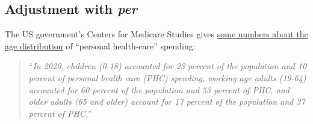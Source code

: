 \documentclass[
  letterpaper,
  DIV=11,
  numbers=noendperiod,
  oneside]{scrartcl}
\begin{document}

\subsection{\texorpdfstring{Adjustment with
\emph{per}}{Adjustment with per}}\label{sec-per-adjustment}

The US government's Centers for Medicare Studies gives
\href{https://www.cms.gov/Research-Statistics-Data-and-Systems/Statistics-Trends-and-Reports/NationalHealthExpendData/Downloads/AgeandGenderHighlights.pdf}{some
numbers about the age distribution} of ``personal health-care''
spending:

\begin{quote}
``\emph{In 2020, children (0-18) accounted for 23 percent of the
population and 10 percent of personal health care (PHC) spending,
working age adults (19-64) accounted for 60 percent of the population
and 53 percent of PHC, and older adults (65 and older) account for 17
percent of the population and 37 percent of PHC.}''
\end{quote}

\end{document}
